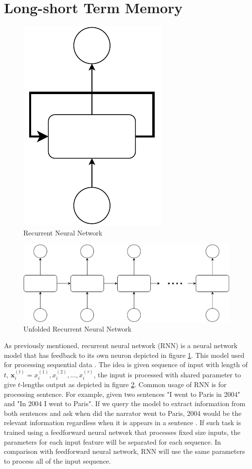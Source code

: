 \section{Long-short Term Memory}
    \begin{figure}[H]
        \centering
        \includegraphics[width=.15\linewidth]{images/rnn.pdf}
        \caption{Recurrent Neural Network}
        \label{fig:rnn}
    \end{figure}
    \begin{figure}[H]
        \centering
        \includegraphics[width=.6\linewidth]{images/unfolded_rnn.pdf}
        \caption{Unfolded Recurrent Neural Network}
        \label{fig:unfolded_rnn}
    \end{figure}
    As previously mentioned, recurrent neural network (RNN) is a
    neural network model that has feedback to its own neuron depicted
    in figure \ref{fig:rnn}. This model used for processing sequential
    data \citep{Goodfellow-et-al-2016}. The idea is given sequence of
    input with length of $t$, $\mathbf{x}_i^{(t)} = x_i^{(1)}, x_i^{(2)},
    \dots, x_i^{(\tau)}$, the input is processed with shared parameter to
    give $t$-lengths output as depicted in figure
    \ref{fig:unfolded_rnn}. Common usage of RNN is for processing
    sentence. For example, given two sentences "I went to Paris in
    2004" and "In 2004 I went to Paris". If we query the model to
    extract information from both sentences and ask when did the
    narrator went to Paris, 2004 would be the relevant information
    regardless when it is appears in a sentence
    \citep{Goodfellow-et-al-2016}. If such task is trained using a
    feedforward neural network that processes fixed size inputs, the
    parameters for each input feature will be separated for each
    sequence. In comparison with feedforward neural network, RNN will
    use the same parameters to process all of the input sequence. 

